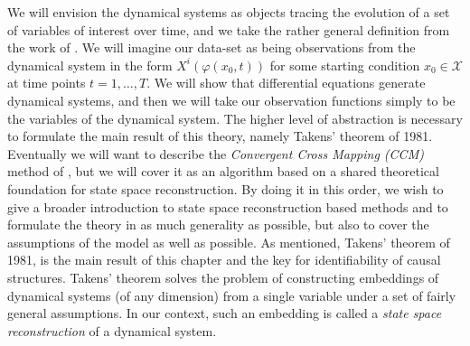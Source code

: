 \documentclass[11pt, a4paper]{memoir}
\theoremstyle{break}
\theoremstyle{break}
\theoremstyle{nonumberplain}
\begin{document}
We will envision the dynamical systems as objects tracing the evolution of a set of variables of interest over time, and we take the rather general definition from the work of \cite{inbook}. We will imagine our data-set as being observations from the dynamical system in the form $X^i(\varphi(x_0,t))$ for some starting condition $x_0\in \mathcal{X}$ at time points $t=1,\ldots, T$. We will show that differential equations generate dynamical systems, and then we will take our observation functions simply to be the variables of the dynamical system. The higher level of abstraction is necessary to formulate the main result of this theory, namely Takens' theorem of 1981.\\[5pt]
Eventually we will want to describe the \textit{Convergent Cross Mapping (CCM)} method of \cite{Sugihara}, but we will cover it as an algorithm based on a shared theoretical foundation for state space reconstruction. By doing it in this order, we wish to give a broader introduction to state space reconstruction based methods and to formulate the theory in as much generality as possible, but also to cover the assumptions of the model as well as possible. As mentioned, Takens' theorem of 1981, \cite{Takens} is the main result of this chapter and the key for identifiability of causal structures. Takens' theorem solves the problem of constructing embeddings of dynamical systems (of any dimension) from a single variable under a set of fairly general assumptions. In our context, such an embedding is called a \textit{state space reconstruction} of a dynamical system.
\end{document}

